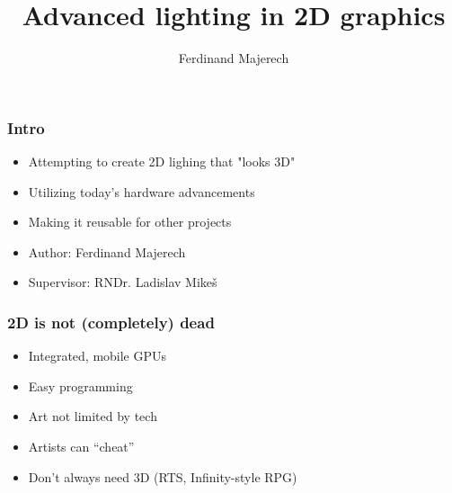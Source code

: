 \documentclass{beamer}
\begin{document}
\title{Advanced lighting in 2D graphics}
\author{Ferdinand Majerech}

\begin{frame}[plain] 
  \titlepage
\end{frame}


\begin{frame}\frametitle{Intro}

\begin{itemize}
\item
  Attempting to create 2D lighing that "looks 3D"
\item
  Utilizing today's hardware advancements
\item
  Making it reusable for other projects
\item
  Author: Ferdinand Majerech
\item
  Supervisor: RNDr. Ladislav Mikeš
\end{itemize}

\end{frame}

\begin{frame}\frametitle{2D is not (completely) dead}

\begin{itemize}
\item
  Integrated, mobile GPUs
\item
  Easy programming
\item
  Art not limited by tech
\item
  Artists can ``cheat''
\item
  Don't always need 3D (RTS, Infinity-style RPG)
\end{itemize}

\end{frame}
\end{document}
